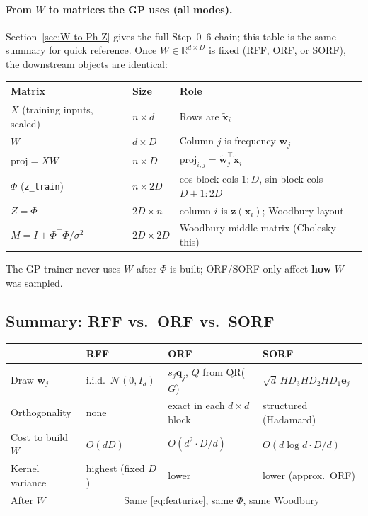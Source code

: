 \documentclass[11pt]{article}
\newcommand{\noise}{\sigma^2}
\newcommand{\Ph}{\Phi}
\newcommand{\Zmat}{Z}
\begin{document}
\paragraph{From $W$ to matrices the GP uses (all modes).}
Section~\ref{sec:W-to-Ph-Z} gives the full Step~0--6 chain; this table is the same summary for quick reference.
Once $W\in\mathbb{R}^{d\times D}$ is fixed (RFF, ORF, or SORF), the downstream objects are identical:
\begin{center}
\renewcommand{\arraystretch}{1.25}
\begin{tabular}{@{}lll@{}}
\toprule
\textbf{Matrix} & \textbf{Size} & \textbf{Role} \\
\midrule
$X$ (training inputs, scaled) & $n\times d$ & Rows are $\tilde{\mathbf x}_i^{\top}$ \\
$W$ & $d\times D$ & Column $j$ is frequency $\mathbf w_j$ \\
$\mathrm{proj}=XW$ & $n\times D$ & $\mathrm{proj}_{i,j}=\tilde{\mathbf w}_j^{\top}\tilde{\mathbf x}_i$ \\
$\Ph$ (\texttt{z\_train}) & $n\times 2D$ & cos block cols $1{:}D$, sin block cols $D{+}1{:}2D$ \\
$\Zmat=\Ph^{\top}$ & $2D\times n$ & column $i$ is $\mathbf z(\mathbf x_i)$; Woodbury layout \\
$M=I+\Ph^{\top}\Ph/\noise$ & $2D\times 2D$ & Woodbury middle matrix (Cholesky this) \\
\bottomrule
\end{tabular}
\end{center}
The GP trainer never uses $W$ after $\Ph$ is built; ORF/SORF only affect \textbf{how} $W$ was sampled.

\subsection{Summary: RFF vs.\ ORF vs.\ SORF}
\label{sec:rff-orf-sorf-summary}

\begin{center}
\renewcommand{\arraystretch}{1.3}
\begin{tabular}{@{}p{}p{}p{}p{}@{}}
\toprule
 & \textbf{RFF} & \textbf{ORF} & \textbf{SORF} \\
\midrule
Draw $\mathbf w_j$ & i.i.d.\ $\mathcal N(0,I_d)$ & $s_j\mathbf q_j$, $Q$ from QR($G$) & $\sqrt{d}\,H D_3 H D_2 H D_1 \mathbf e_j$ \\
Orthogonality & none & exact in each $d\times d$ block & structured (Hadamard) \\
Cost to build $W$ & $O(dD)$ & $O(d^2\cdot D/d)$ & $O(d\log d\cdot D/d)$ \\
Kernel variance & highest (fixed $D$) & lower & lower (approx.\ ORF) \\
After $W$ & \multicolumn{3}{c}{Same \eqref{eq:featurize}, same $\Ph$, same Woodbury} \\
\bottomrule
\end{tabular}
\end{center}
\end{document}
